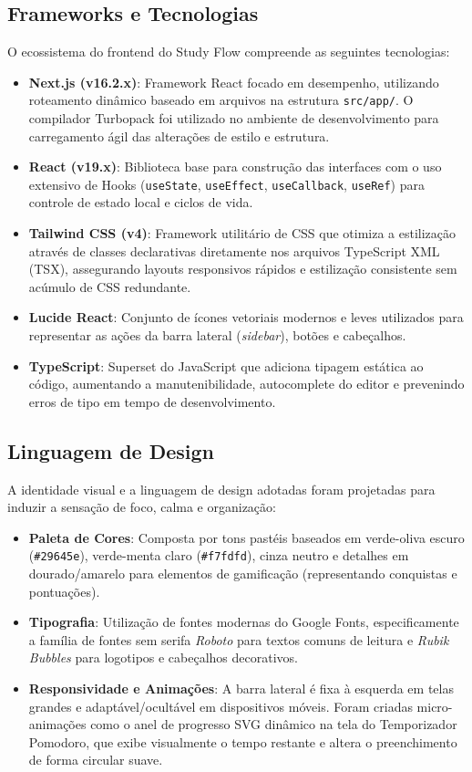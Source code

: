 \documentclass[12pt,a4paper]{article}
\begin{document}
\subsection{Frameworks e Tecnologias}
O ecossistema do frontend do Study Flow compreende as seguintes tecnologias:
\begin{itemize}
    \item \textbf{Next.js (v16.2.x)}: Framework React focado em desempenho, utilizando roteamento dinâmico baseado em arquivos na estrutura \texttt{src/app/}. O compilador Turbopack foi utilizado no ambiente de desenvolvimento para carregamento ágil das alterações de estilo e estrutura.
    \item \textbf{React (v19.x)}: Biblioteca base para construção das interfaces com o uso extensivo de Hooks (\texttt{useState}, \texttt{useEffect}, \texttt{useCallback}, \texttt{useRef}) para controle de estado local e ciclos de vida.
    \item \textbf{Tailwind CSS (v4)}: Framework utilitário de CSS que otimiza a estilização através de classes declarativas diretamente nos arquivos TypeScript XML (TSX), assegurando layouts responsivos rápidos e estilização consistente sem acúmulo de CSS redundante.
    \item \textbf{Lucide React}: Conjunto de ícones vetoriais modernos e leves utilizados para representar as ações da barra lateral (\emph{sidebar}), botões e cabeçalhos.
    \item \textbf{TypeScript}: Superset do JavaScript que adiciona tipagem estática ao código, aumentando a manutenibilidade, autocomplete do editor e prevenindo erros de tipo em tempo de desenvolvimento.
\end{itemize}

\subsection{Linguagem de Design}
A identidade visual e a linguagem de design adotadas foram projetadas para induzir a sensação de foco, calma e organização:
\begin{itemize}
    \item \textbf{Paleta de Cores}: Composta por tons pastéis baseados em verde-oliva escuro (\texttt{\#29645e}), verde-menta claro (\texttt{\#f7fdfd}), cinza neutro e detalhes em dourado/amarelo para elementos de gamificação (representando conquistas e pontuações).
    \item \textbf{Tipografia}: Utilização de fontes modernas do Google Fonts, especificamente a família de fontes sem serifa \emph{Roboto} para textos comuns de leitura e \emph{Rubik Bubbles} para logotipos e cabeçalhos decorativos.
    \item \textbf{Responsividade e Animações}: A barra lateral é fixa à esquerda em telas grandes e adaptável/ocultável em dispositivos móveis. Foram criadas micro-animações como o anel de progresso SVG dinâmico na tela do Temporizador Pomodoro, que exibe visualmente o tempo restante e altera o preenchimento de forma circular suave.
\end{itemize}
\end{document}
